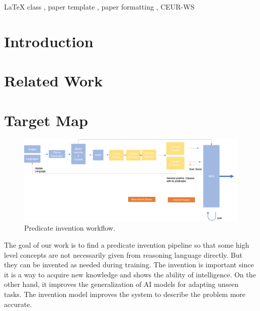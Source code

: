 \documentclass[
]{ceurart}
\begin{document}
\begin{keywords}
  LaTeX class \sep
  paper template \sep
  paper formatting \sep
  CEUR-WS
\end{keywords}

\maketitle

\section{Introduction}


\section{Related Work}


\section{Target Map}



\begin{figure}[h]
	\centering
	\begin{minipage}{\textwidth}
		\includegraphics[width=\linewidth]{img/pi_structure.png} 
		\caption{Predicate invention workflow.}
		\label{fig:pi-structure}
	\end{minipage}
\end{figure}

The goal of our work is to find a predicate invention pipeline so that some high level concepts are not necessarily given from reasoning language directly. But they can be invented as needed during training. The invention is important since it is a way to acquire new knowledge and shows the ability of intelligence. On the other hand, it improves the generalization of AI models for adapting unseen tasks. The invention model improves the system to describe the problem more accurate.
\end{document}
